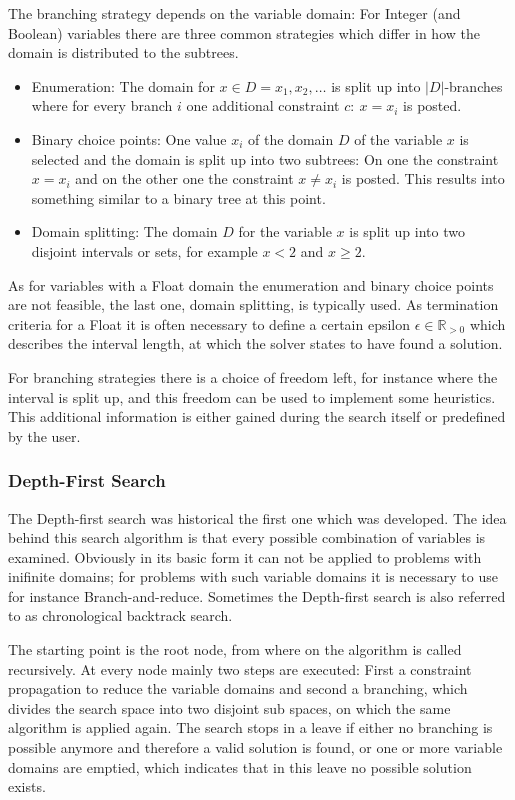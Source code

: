 \documentclass[10pt,
               a4paper,
               journal,
               ]{IEEEtran}
\begin{document}
	The branching strategy depends on the variable domain: For Integer (and Boolean) variables there are three common strategies \cite[p.~87]{handbookCP} which differ in how the domain is distributed to the subtrees.
	\begin{itemize}
		\item Enumeration: The domain for $x \in D = {x_1, x_2, \dots}$ is split up into $|D|$-branches where for every branch $i$ one additional constraint $c:\ x = x_i$ is posted.
		\item Binary choice points: One value $x_i$ of the domain $D$ of the variable $x$ is selected and the domain is split up into two subtrees: On one the constraint $x = x_i$ and on the other one the constraint $x \ne x_i$ is posted. This results into something similar to a binary tree at this point.
		\item Domain splitting: The domain $D$ for the variable $x$ is split up into two disjoint intervals or sets, for example $x < 2$ and $x \ge 2$.
	\end{itemize}
	
	As for variables with a Float domain the enumeration and binary choice points are not feasible, the last one, domain splitting, is typically used. As termination criteria for a Float it is often necessary to define a certain epsilon $\epsilon \in \mathbb{R}_{>0}$ which describes the interval length, at which the solver states to have found a solution.
	
	For branching strategies there is a choice of freedom left, for instance where the interval is split up, and this freedom can be used to implement some heuristics. This additional information is either gained during the search itself or predefined by the user.
	
	\subsubsection{Depth-First Search}
	The Depth-first search was historical the first one which was developed. The idea behind this search algorithm is that every possible combination of variables is examined. Obviously in its basic form it can not be applied to problems with inifinite domains; for problems with such variable domains it is necessary to use for instance Branch-and-reduce. Sometimes the Depth-first search is also referred to as chronological backtrack search.
	
	The starting point is the root node, from where on the algorithm is called recursively. At every node mainly two steps are executed: First a constraint propagation to reduce the variable domains and second a branching, which divides the search space into two disjoint sub spaces, on which the same algorithm is applied again. The search stops in a leave if either no branching is possible anymore and therefore a valid solution is found, or one or more variable domains are emptied, which indicates that in this leave no possible solution exists.
	
\end{document}
